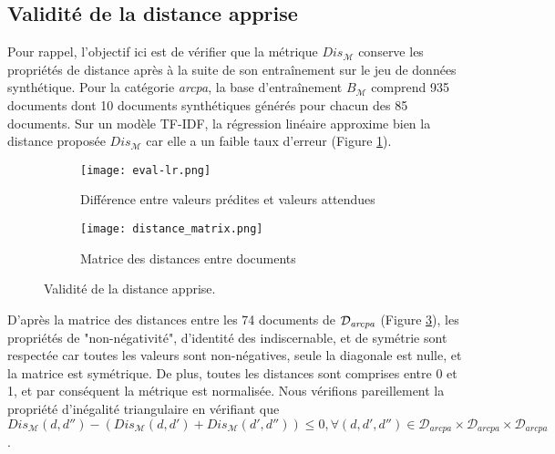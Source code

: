 \subsection{Validité de la distance apprise}
Pour rappel, l'objectif ici est de vérifier que la métrique $Dis_{\mathcal{M}}$ conserve les propriétés de distance après à la suite de son entraînement sur le jeu de données synthétique.
Pour la catégorie \textit{arcpa}, la base d'entraînement $B_\mathcal{M}$ comprend 935 documents dont 10 documents synthétiques générés pour chacun des 85 documents. Sur un modèle TF-IDF, la régression linéaire approxime bien la distance proposée $Dis_\mathcal{M}$ car elle a un faible taux d'erreur (Figure \ref{fig:similarite:eval-regression}).

%	
%
\begin{figure}[!htb]
\begin{subfigure}[ht]{0.49\textwidth}
	\centering \texttt{[image: eval-lr.png]} \hfil
	
	\caption{Différence entre valeurs prédites et valeurs attendues}\label{fig:similarite:eval-regression}
\end{subfigure}
\begin{subfigure}[ht]{0.49\textwidth}
	\centering \texttt{[image: distance\_matrix.png]}
	\caption{Matrice des distances entre documents}\label{fig:similarite:distance_matrix}
\end{subfigure}
\caption{Validité de la distance apprise.}
\end{figure}

D'après la matrice des distances entre les 74 documents de $\mathcal{D_{\text{\textit{arcpa}}}}$ (Figure \ref{fig:similarite:distance_matrix}), les propriétés de "non-négativité", d'identité des indiscernable, et de symétrie sont respectée car toutes les valeurs sont non-négatives, seule la diagonale est nulle, et la matrice est symétrique. De plus, toutes les distances sont comprises entre 0 et 1, et par conséquent la métrique est normalisée. Nous vérifions pareillement la propriété d'inégalité triangulaire en vérifiant que  $Dis_\mathcal{M}(d,d'') - (Dis_\mathcal{M}(d,d') + Dis_\mathcal{M}(d',d'')) \leq 0, \forall (
d,d',d'') \in \mathcal{D}_{arcpa} \times \mathcal{D}_{arcpa} \times \mathcal{D}_{arcpa}$.%

